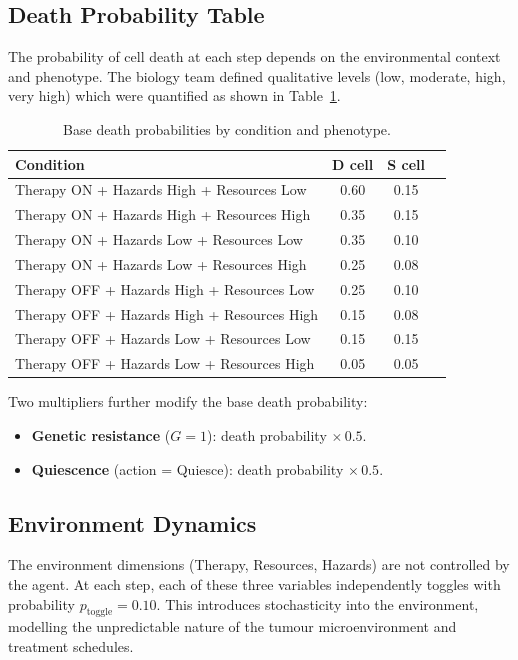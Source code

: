\documentclass[12pt,a4paper]{article}
\begin{document}
\subsection{Death Probability Table}

The probability of cell death at each step depends on the environmental context and phenotype. The biology team defined qualitative levels (low, moderate, high, very high) which were quantified as shown in Table~\ref{tab:death_prob}.

\begin{table}[H]
\centering
\caption{Base death probabilities by condition and phenotype.}
\label{tab:death_prob}
\begin{tabular}{lccc}
\toprule
\textbf{Condition} & \textbf{D cell} & \textbf{S cell} \\
\midrule
Therapy ON + Hazards High + Resources Low   & 0.60 & 0.15 \\
Therapy ON + Hazards High + Resources High  & 0.35 & 0.15 \\
Therapy ON + Hazards Low + Resources Low    & 0.35 & 0.10 \\
Therapy ON + Hazards Low + Resources High   & 0.25 & 0.08 \\
Therapy OFF + Hazards High + Resources Low  & 0.25 & 0.10 \\
Therapy OFF + Hazards High + Resources High & 0.15 & 0.08 \\
Therapy OFF + Hazards Low + Resources Low   & 0.15 & 0.15 \\
Therapy OFF + Hazards Low + Resources High  & 0.05 & 0.05 \\
\bottomrule
\end{tabular}
\end{table}

Two multipliers further modify the base death probability:
\begin{itemize}[nosep]
    \item \textbf{Genetic resistance} ($G=1$): death probability $\times\,0.5$.
    \item \textbf{Quiescence} (action = Quiesce): death probability $\times\,0.5$.
\end{itemize}

\subsection{Environment Dynamics}

The environment dimensions (Therapy, Resources, Hazards) are not controlled by the agent. At each step, each of these three variables independently toggles with probability $p_{\text{toggle}} = 0.10$. This introduces stochasticity into the environment, modelling the unpredictable nature of the tumour microenvironment and treatment schedules.
\end{document}
